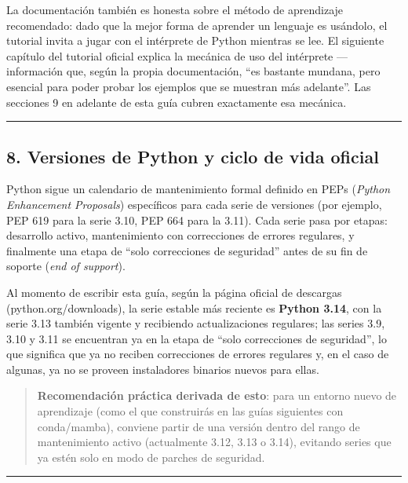 \documentclass[
  doc,
  floatsintext,
  longtable,
  a4paper,
  nolmodern,
  notxfonts,
  notimes,
  12pt,
  colorlinks=true,linkcolor=blue,citecolor=blue,urlcolor=blue]{apa7}
\begin{document}
La documentación también es honesta sobre el método de aprendizaje
recomendado: dado que la mejor forma de aprender un lenguaje es
usándolo, el tutorial invita a jugar con el intérprete de Python
mientras se lee. El siguiente capítulo del tutorial oficial explica la
mecánica de uso del intérprete --- información que, según la propia
documentación, ``es bastante mundana, pero esencial para poder probar
los ejemplos que se muestran más adelante''. Las secciones 9 en adelante
de esta guía cubren exactamente esa mecánica.

\begin{center}\rule{0.5\linewidth}{0.5pt}\end{center}

\subsection{8. Versiones de Python y ciclo de vida
oficial}\label{versiones-de-python-y-ciclo-de-vida-oficial}

Python sigue un calendario de mantenimiento formal definido en PEPs
(\emph{Python Enhancement Proposals}) específicos para cada serie de
versiones (por ejemplo, PEP 619 para la serie 3.10, PEP 664 para la
3.11). Cada serie pasa por etapas: desarrollo activo, mantenimiento con
correcciones de errores regulares, y finalmente una etapa de ``solo
correcciones de seguridad'' antes de su fin de soporte (\emph{end of
support}).

Al momento de escribir esta guía, según la página oficial de descargas
(python.org/downloads), la serie estable más reciente es \textbf{Python
3.14}, con la serie 3.13 también vigente y recibiendo actualizaciones
regulares; las series 3.9, 3.10 y 3.11 se encuentran ya en la etapa de
``solo correcciones de seguridad'', lo que significa que ya no reciben
correcciones de errores regulares y, en el caso de algunas, ya no se
proveen instaladores binarios nuevos para ellas.

\begin{quote}
\textbf{Recomendación práctica derivada de esto}: para un entorno nuevo
de aprendizaje (como el que construirás en las guías siguientes con
conda/mamba), conviene partir de una versión dentro del rango de
mantenimiento activo (actualmente 3.12, 3.13 o 3.14), evitando series
que ya estén solo en modo de parches de seguridad.
\end{quote}

\begin{center}\rule{0.5\linewidth}{0.5pt}\end{center}
\end{document}
